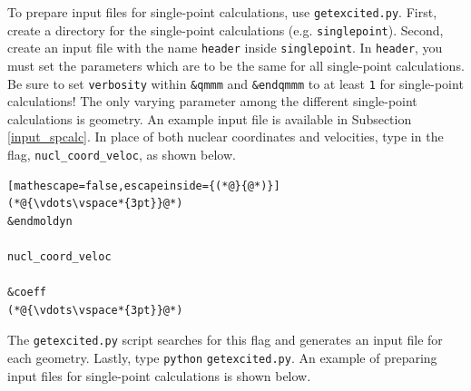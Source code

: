 \documentclass[letterpaper,12pt,titlepage]{article}
\begin{document}
To prepare input files for single-point calculations, use \verb+getexcited.py+.  First, create a directory for the single-point calculations (e.g. \verb+singlepoint+).  Second, create an input file with the name \verb+header+ inside \verb+singlepoint+.  In \verb+header+, you must set the parameters which are to be the same for all single-point calculations.  Be sure to set \verb+verbosity+ within \verb+&qmmm+ and \verb+&endqmmm+ to at least \verb+1+ for single-point calculations!  The only varying parameter among the different single-point calculations is geometry.  An example input file is available in Subsection \ref{input_spcalc}.  In place of both nuclear coordinates and velocities, type in the flag, \verb+nucl_coord_veloc+, as shown below.
\begin{lstlisting}[mathescape=false,escapeinside={(*@}{@*)}]
(*@{\vdots\vspace*{3pt}}@*)
&endmoldyn

nucl_coord_veloc

&coeff
(*@{\vdots\vspace*{3pt}}@*)
\end{lstlisting}
The \verb+getexcited.py+ script searches for this flag and generates an input file for each geometry.  Lastly, type \verb+python+ \verb+getexcited.py+.  An example of preparing input files for single-point calculations is shown below.
\newline
\end{document}
